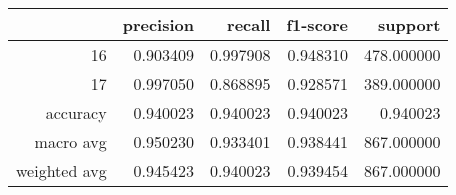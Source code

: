 \begin{tabular}{rrrrr}
\toprule
 & precision & recall & f1-score & support \\
\midrule
16 & 0.903409 & 0.997908 & 0.948310 & 478.000000 \\
17 & 0.997050 & 0.868895 & 0.928571 & 389.000000 \\
accuracy & 0.940023 & 0.940023 & 0.940023 & 0.940023 \\
macro avg & 0.950230 & 0.933401 & 0.938441 & 867.000000 \\
weighted avg & 0.945423 & 0.940023 & 0.939454 & 867.000000 \\
\bottomrule
\end{tabular}
